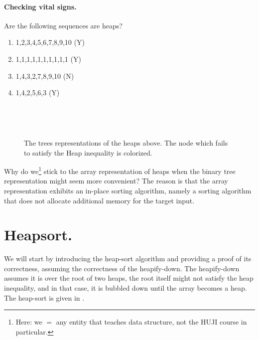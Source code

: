 \paragraph{Checking vital signs.}Are the following sequences are heaps? 
\begin{enumerate}
  \item 1,2,3,4,5,6,7,8,9,10 (Y)
  \item 1,1,1,1,1,1,1,1,1,1  (Y)
  \item 1,4,3,2,7,8,9,10     (N)
  \item 1,4,2,5,6,3	     (Y)
\end{enumerate}
\begin{figure}[h]
  \centering
  \begin{subfigure}[b]{0.9\textwidth}
  
  \end{subfigure}
  \\
  \begin{subfigure}[b]{0.45\textwidth}
	
  \end{subfigure}
\begin{subfigure}[b]{0.45\textwidth}
	
  \end{subfigure} 
  \\ 
\begin{subfigure}[b]{0.9\textwidth}
	
  \end{subfigure}
  \caption{The trees representations of the heaps above. The node which fails to satisfy the Heap inequality is colorized.}
\end{figure}

\begin{remark}
Why do we\footnote{Here: we $=$ any entity that teaches data structure, not the HUJI course in particular.} stick to the array representation of heaps when the binary tree representation might seem more convenient? The reason is that the array representation exhibits an in-place sorting algorithm, namely a sorting algorithm that does not allocate additional memory for the target input.
\end{remark} 


\section{Heapsort.}
We will start by introducing the heap-sort algorithm and providing a proof of its correctness, assuming the correctness of the heapify-down. The heapify-down assumes it is over the root of two heaps, the root itself might not satisfy the heap inequality, and in that case, it is bubbled down until the array becomes a heap. The heap-sort is given in .

